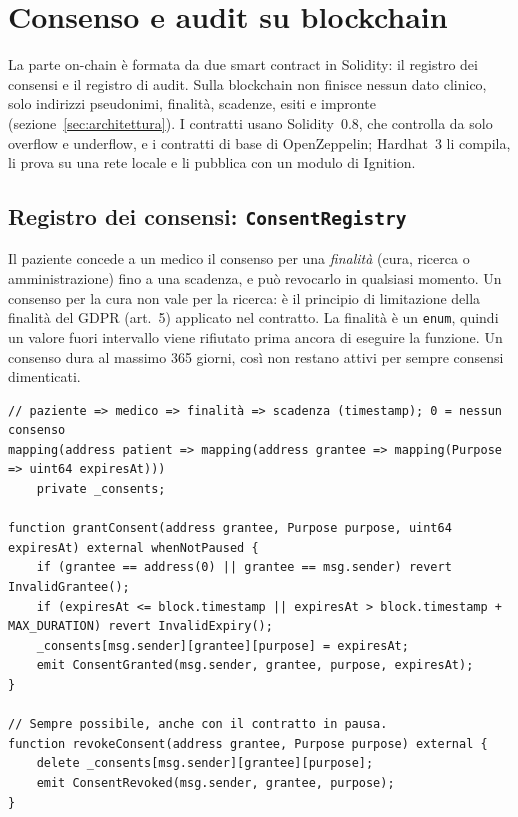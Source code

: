 \section{Consenso e audit su blockchain}\label{sec:blockchain}

La parte on-chain è formata da due smart contract in Solidity: il registro dei consensi e il registro di audit. Sulla blockchain non finisce nessun dato clinico, solo indirizzi pseudonimi, finalità, scadenze, esiti e impronte (sezione~\ref{sec:architettura}). I contratti usano Solidity~0.8, che controlla da solo overflow e underflow, e i contratti di base di OpenZeppelin\cite{openzeppelin}; Hardhat~3 li compila, li prova su una rete locale e li pubblica con un modulo di Ignition.

\subsection{Registro dei consensi: \texttt{ConsentRegistry}}
Il paziente concede a un medico il consenso per una \emph{finalità} (cura, ricerca o amministrazione) fino a una scadenza, e può revocarlo in qualsiasi momento. Un consenso per la cura non vale per la ricerca: è il principio di limitazione della finalità del GDPR (art.~5\cite{gdpr}) applicato nel contratto. La finalità è un \texttt{enum}, quindi un valore fuori intervallo viene rifiutato prima ancora di eseguire la funzione. Un consenso dura al massimo 365 giorni, così non restano attivi per sempre consensi dimenticati.

\begin{lstlisting}[language=Solidity,caption={Concessione, revoca e verifica di un consenso (\texttt{ConsentRegistry.sol}, estratto).},label={lst:consent}]
// paziente => medico => finalità => scadenza (timestamp); 0 = nessun consenso
mapping(address patient => mapping(address grantee => mapping(Purpose => uint64 expiresAt)))
    private _consents;

function grantConsent(address grantee, Purpose purpose, uint64 expiresAt) external whenNotPaused {
    if (grantee == address(0) || grantee == msg.sender) revert InvalidGrantee();
    if (expiresAt <= block.timestamp || expiresAt > block.timestamp + MAX_DURATION) revert InvalidExpiry();
    _consents[msg.sender][grantee][purpose] = expiresAt;
    emit ConsentGranted(msg.sender, grantee, purpose, expiresAt);
}

// Sempre possibile, anche con il contratto in pausa.
function revokeConsent(address grantee, Purpose purpose) external {
    delete _consents[msg.sender][grantee][purpose];
    emit ConsentRevoked(msg.sender, grantee, purpose);
}
\end{lstlisting}

